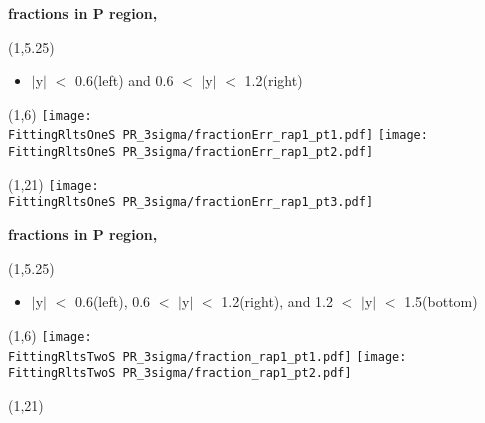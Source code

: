 \documentclass[11pt,slidescentered,red,compress,handout,hyperref={bookmarks=true},mathseriftable]{beamer}
\newcommand{\FittingRltsOneS}{../Psi1S/Fit/parameter/evaluateCtau/}
\newcommand{\FittingRltsTwoS}{../Psi2S/Fit/parameter/evaluateCtau/}
\begin{document}
\begin{frame}[t]{\small \bf fractions in P region,  }{}
\begin{textblock}{48}(1,5.25)
\begin{itemize}
\scriptsize \item  $|$y$|$ $<$ 0.6(left) and 0.6 $<$ $|$y$|$ $<$ 1.2(right)
\end{itemize}
\end{textblock}
\begin{textblock}{48}(1,6)
\hspace*{10pt} \texttt{[image: \\FittingRltsOneS PR\_3sigma/fractionErr\_rap1\_pt1.pdf]}
\hspace*{10pt} \texttt{[image: \\FittingRltsOneS PR\_3sigma/fractionErr\_rap1\_pt2.pdf]}
\begin{textblock}{48}(1,21)
\hspace*{10pt} \texttt{[image: \\FittingRltsOneS PR\_3sigma/fractionErr\_rap1\_pt3.pdf]}
\end{textblock}
\end{textblock}
\end{frame}

\begin{frame}[t]{\small \bf fractions in P region,  }{}
\begin{textblock}{48}(1,5.25)
\begin{itemize}
\scriptsize \item  $|$y$|$ $<$ 0.6(left), 0.6 $<$ $|$y$|$ $<$ 1.2(right), and 1.2 $<$ $|$y$|$ $<$ 1.5(bottom)
\end{itemize}
\end{textblock}
\begin{textblock}{48}(1,6)
\hspace*{10pt} \texttt{[image: \\FittingRltsTwoS PR\_3sigma/fraction\_rap1\_pt1.pdf]}
\hspace*{10pt} \texttt{[image: \\FittingRltsTwoS PR\_3sigma/fraction\_rap1\_pt2.pdf]}
\begin{textblock}{48}(1,21)
\end{textblock}
\end{textblock}
\end{frame}
\end{document}
